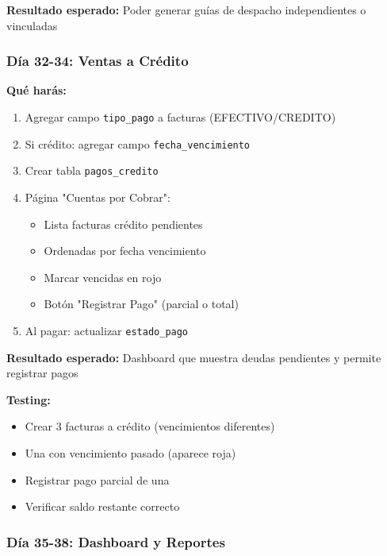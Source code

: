 \documentclass[11pt,a4paper]{article}
\begin{document}
\textbf{Resultado esperado:} Poder generar guías de despacho independientes o vinculadas

\subsubsection{Día 32-34: Ventas a Crédito}

\textbf{Qué harás:}
\begin{enumerate}
    \item Agregar campo \texttt{tipo\_pago} a facturas (EFECTIVO/CREDITO)
    \item Si crédito: agregar campo \texttt{fecha\_vencimiento}
    \item Crear tabla \texttt{pagos\_credito}
    \item Página "Cuentas por Cobrar":
    \begin{itemize}
        \item Lista facturas crédito pendientes
        \item Ordenadas por fecha vencimiento
        \item Marcar vencidas en rojo
        \item Botón "Registrar Pago" (parcial o total)
    \end{itemize}
    \item Al pagar: actualizar \texttt{estado\_pago}
\end{enumerate}

\textbf{Resultado esperado:} Dashboard que muestra deudas pendientes y permite registrar pagos

\textbf{Testing:}
\begin{itemize}
    \item Crear 3 facturas a crédito (vencimientos diferentes)
    \item Una con vencimiento pasado (aparece roja)
    \item Registrar pago parcial de una
    \item Verificar saldo restante correcto
\end{itemize}

\subsubsection{Día 35-38: Dashboard y Reportes}
\end{document}
